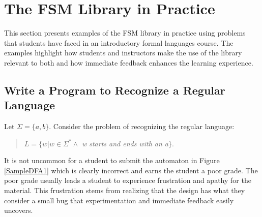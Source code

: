 \documentclass{eptcs}
\begin{document}
\section{The \textsf{FSM} Library in Practice}
This section presents examples of the \textsf{FSM} library in practice using problems that students have faced in an introductory formal languages course. The examples highlight how students and instructors make the use of the library relevant to both and how immediate feedback enhances the learning experience.

\subsection{Write a Program to Recognize a Regular Language}
\label{dfa}
Let $\Sigma = \{a, b\}$. Consider the problem of recognizing the regular language:
\begin{quote}
$L = \{$$w | w \in \Sigma^* \wedge$ \emph{w starts and ends with an a}$\}$.
\end{quote}
It is not uncommon for a student to submit the automaton in Figure \ref{SampleDFA1} which is clearly incorrect and earns the student a poor grade. The poor grade usually leads a student to experience frustration and apathy for the material. This frustration stems from realizing that the design has what they consider a small bug that experimentation and immediate feedback easily uncovers.

\newcommand{\DFA}{
\begin{psmatrix}[rowsep=.5cm,colsep=.2cm,mnode=circle,fillstyle=solid,fillcolor=LightBlue]
             & & & & & & & & [name=N4] ds  \\
             & & & & [name=N1] q$_0$ \\
             & & & & & & & & [name=N2] q$_1$  & & & & & &  [name=N3] q$_2$\\
             & & & &
\end{psmatrix}

\psset{arrows=->,linecolor=black,arcangle=30,arrowsize=4pt
2,labelsep=2pt}}

\newcommand{\DFAc}{
\begin{psmatrix}[rowsep=.5cm,colsep=.2cm,mnode=circle,fillstyle=solid,fillcolor=LightBlue]
             & & & & & & & & [name=N5] ds  \\
             & & & & [name=N6] q$_0$ \\
             & & & & & & & & [name=N7] q$_1$  & & & & & &  [name=N8] q$_2$\\
             & & & &
\end{psmatrix}

\psset{arrows=->,linecolor=black,arcangle=30,arrowsize=4pt
2,labelsep=2pt}}
\end{document}
